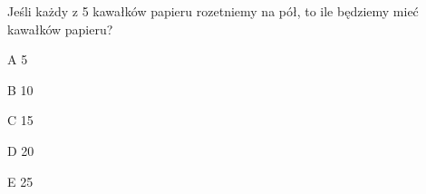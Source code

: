 \begin{tresc}
Jeśli każdy z 5 kawałków papieru rozetniemy na pół, to ile będziemy mieć kawałków papieru?
\end{tresc}
\begin{wariant}{A} 5 \end{wariant}
\begin{wariant}{B} 10 \end{wariant}
\begin{wariant}{C} 15 \end{wariant}
\begin{wariant}{D} 20 \end{wariant}
\begin{wariant}{E} 25 \end{wariant}
